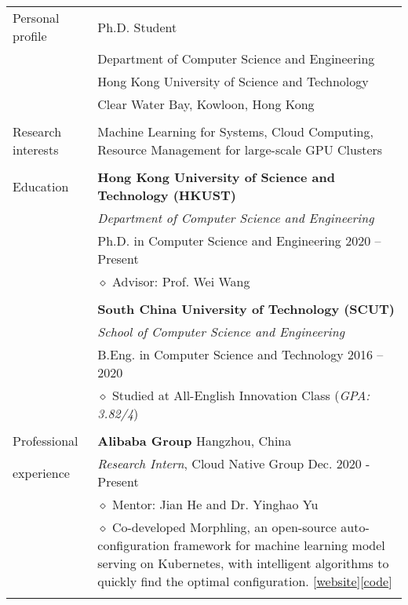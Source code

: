 \documentclass[letterpaper, 11pt]{article}
\begin{document}
\begin{longtable}{p{1.3in}p{4.8in}}

{Personal profile}
& Ph.D. Student \\
& Department of Computer Science and Engineering \\
& Hong Kong University of Science and Technology \\
& Clear Water Bay, Kowloon, Hong Kong \\
& \\

\nohyphens{Research interests}
& Machine Learning for Systems, Cloud Computing, Resource Management for large-scale GPU Clusters \\
& \\

{Education}
& \textbf{Hong Kong University of Science and Technology (HKUST)} \\
& \textit{Department of Computer Science and Engineering} \\
& Ph.D. in Computer Science and Engineering \hfill 2020 -- Present \\
& $\diamond$ Advisor: Prof. Wei Wang \\
& \\

& \textbf{South China University of Technology (SCUT)} \\
& \textit{School of Computer Science and Engineering} \\
& B.Eng. in Computer Science and Technology \hfill 2016 -- 2020 \\
& $\diamond$ Studied at All-English Innovation Class ({\it GPA: 3.82/4}) \\
& \\


{Professional}
& {\textbf{Alibaba Group}} \hfill Hangzhou, China \\
{experience}
& \textit{Research Intern}, Cloud Native Group \hfill Dec. 2020 - Present \\
& $\diamond$ Mentor: Jian He and Dr. Yinghao Yu \\
& $\diamond$ Co-developed Morphling, an open-source auto-configuration framework for machine learning model serving on Kubernetes, with intelligent algorithms to quickly find the optimal configuration. [\href{https://kubedl.io/tuning/intro/}{\underline{website}}][\href{https://github.com/kubedl-io/morphling}{\underline{code}}] \\
& \\


\end{longtable}
\end{document}
